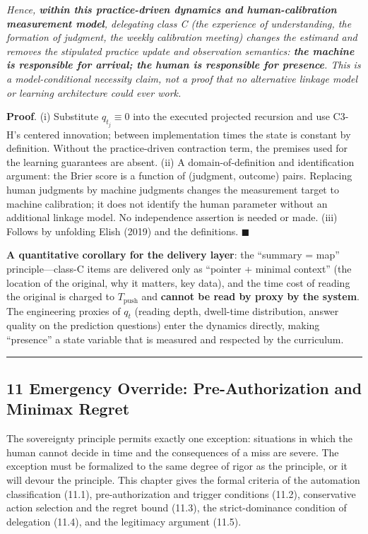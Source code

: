 \documentclass[
  11pt]{article}
\begin{document}
\emph{Hence, \textbf{within this practice-driven dynamics and
human-calibration measurement model}, delegating class C (the experience
of understanding, the formation of judgment, the weekly calibration
meeting) changes the estimand and removes the stipulated practice update
and observation semantics: \textbf{the machine is responsible for
arrival; the human is responsible for presence}. This is a
model-conditional necessity claim, not a proof that no alternative
linkage model or learning architecture could ever work.}

\textbf{Proof}. (i) Substitute \(q_{t_j} \equiv 0\) into the executed
projected recursion and use C3-H's centered innovation; between
implementation times the state is constant by definition. Without the
practice-driven contraction term, the premises used for the learning
guarantees are absent. (ii) A domain-of-definition and identification
argument: the Brier score is a function of (judgment, outcome) pairs.
Replacing human judgments by machine judgments changes the measurement
target to machine calibration; it does not identify the human parameter
without an additional linkage model. No independence assertion is needed
or made. (iii) Follows by unfolding Elish (2019) and the definitions.
\(\blacksquare\)

\textbf{A quantitative corollary for the delivery layer}: the ``summary
= map'' principle---class-C items are delivered only as ``pointer +
minimal context'' (the location of the original, why it matters, key
data), and the time cost of reading the original is charged to
\(T_{\mathrm{push}}\) and \textbf{cannot be read by proxy by the
system}. The engineering proxies of \(q_t\) (reading depth, dwell-time
distribution, answer quality on the prediction questions) enter the
dynamics directly, making ``presence'' a state variable that is measured
and respected by the curriculum.

\begin{center}\rule{0.5\linewidth}{0.5pt}\end{center}

\subsection{11 Emergency Override: Pre-Authorization and Minimax
Regret}\label{emergency-override-pre-authorization-and-minimax-regret}

The sovereignty principle permits exactly one exception: situations in
which the human cannot decide in time and the consequences of a miss are
severe. The exception must be formalized to the same degree of rigor as
the principle, or it will devour the principle. This chapter gives the
formal criteria of the automation classification (11.1),
pre-authorization and trigger conditions (11.2), conservative action
selection and the regret bound (11.3), the strict-dominance condition of
delegation (11.4), and the legitimacy argument (11.5).
\end{document}

